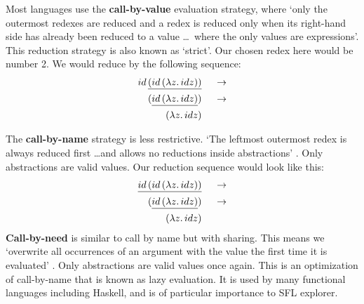 \noindent Most languages use the \textbf{call-by-value} evaluation strategy, where `only the outermost redexes are reduced and a redex is reduced only when its right-hand side has already been reduced to a value \ldots\ where the only values are \lambda expressions'\cite{pierce2002types}. This reduction strategy is also known as `strict'. Our chosen redex here would be number 2. We would reduce by the following sequence:
\begin{alignat*}{2}
id\,\underline{(id\,(\lambda z.\, id z))}  && \;\;\rightarrow\\ 
(\underline{id\,(\lambda z.\, id z)})      && \;\;\rightarrow\\ 
(\lambda z.\, id z)                        && \;\;\\ 
\end{alignat*}

\noindent The \textbf{call-by-name} strategy is less restrictive. `The leftmost outermost redex is always reduced first \ldots and allows no reductions inside abstractions' \cite{pierce2002types}. Only abstractions are valid values. Our reduction sequence would look like this:
\begin{alignat*}{2}
\underline{id\,(id\,(\lambda z.\, id z))}  && \;\;\rightarrow\\ 
(\underline{id\,(\lambda z.\, id z)})      && \;\;\rightarrow\\ 
(\lambda z.\, id z)                        && \;\;\\ 
\end{alignat*}
\noindent \textbf{Call-by-need} is similar to call by name but with sharing. This means we `overwrite all occurrences of an argument with the value the first time it is evaluated' \cite{pierce2002types}. Only abstractions are valid values once again. This is an optimization of call-by-name that is known as lazy evaluation. It is used by many functional languages including Haskell, and is of particular importance to SFL explorer. 


